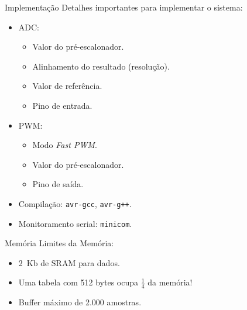 \begin{frame}[fragile]{Implementação}
Detalhes importantes para implementar o sistema:
\begin{itemize}
  \item ADC:
  \begin{itemize}
    \item Valor do pré-escalonador.
    \item Alinhamento do resultado (resolução).
    \item Valor de referência.
    \item Pino de entrada.
  \end{itemize}
  \item PWM:
  \begin{itemize}
    \item Modo \emph{Fast PWM}.
    \item Valor do pré-escalonador.
    \item Pino de saída.
  \end{itemize}
  \item Compilação: \texttt{avr-gcc}, \texttt{avr-g++}.
  \item Monitoramento serial: \texttt{minicom}.
\end{itemize}
\end{frame}


\begin{frame}{Memória}
Limites da Memória:
\begin{itemize}
  \item 2~Kb de SRAM para dados.
  \item Uma tabela com 512 bytes ocupa $\frac{1}{4}$ da memória!
  \item Buffer máximo de 2.000 amostras.
\end{itemize}
\end{frame}



